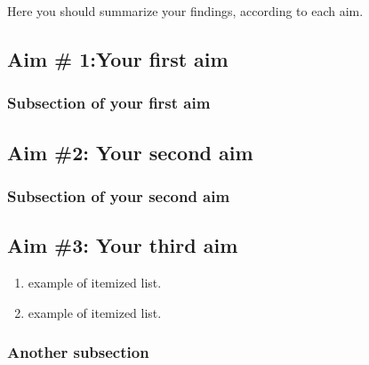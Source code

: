 Here you should summarize your findings, according to each aim.

\subsection{Aim \# 1:Your first aim}

\lipsum[1-3]



\subsubsection{Subsection of your first aim}


\lipsum[1-3]


\subsection{Aim \#2: Your second aim} \label{section:ad-based-op}

\lipsum[1-3]

	\subsubsection{Subsection of your second aim}

	\lipsum[1-3]

\subsection{Aim \#3: Your third aim} 

\lipsum[1-3]

\begin{enumerate}
	\item example of itemized list.
	\item example of itemized list.
\end{enumerate}



\subsubsection{Another subsection}

\lipsum[1-2]

